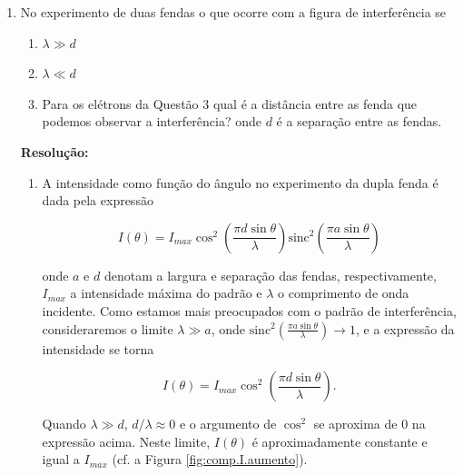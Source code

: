 \documentclass[a4paper, 12pt, notitlepage]{article}
\begin{document}
\begin{enumerate}
\item No experimento de duas fendas o que ocorre com a figura de interferência se
\begin{enumerate}
  \item $\lambda \gg d$
  \item $\lambda \ll d$
  \item Para os elétrons da Questão 3 qual é a distância entre as fenda que podemos observar a interferência? onde $d$ é a separação entre as fendas.
\end{enumerate}

\textbf{Resolução: }
\begin{enumerate}
  \item A intensidade como função do ângulo no experimento da dupla fenda é dada pela expressão

$$ I(\theta) = I_{max} \cos^2 \left(\frac{\pi d \sin \theta}{\lambda}\right) \text{sinc}^2\left(\frac{\pi a \sin \theta}{\lambda}\right) $$

onde $a$ e $d$ denotam a largura e separação das fendas, respectivamente, $I_{max}$ a intensidade máxima do padrão e $\lambda$ o comprimento de onda incidente. Como estamos mais preocupados com o padrão de interferência, consideraremos o limite $\lambda \gg a$, onde $\text{sinc}^2\left(\frac{\pi a \sin \theta}{\lambda}\right) \rightarrow 1$, e a expressão da intensidade se torna

$$ I(\theta) = I_{max} \cos^2\left(\frac{\pi d \sin \theta}{\lambda}\right). $$

Quando $\lambda \gg d$, $d / \lambda \approx 0$ e o argumento de $\cos^2$ se aproxima de $0$ na expressão acima. Neste limite, $I(\theta)$ é aproximadamente constante e igual a $I_{max}$ (cf. a Figura \ref{fig:comp.I.aumento}).
\vspace{0.5cm}

  \def\FunctionI[#1](#2){cos(pi * sin(#2) / #1)^2}
  
  

\end{enumerate}
\end{enumerate}
\end{document}
